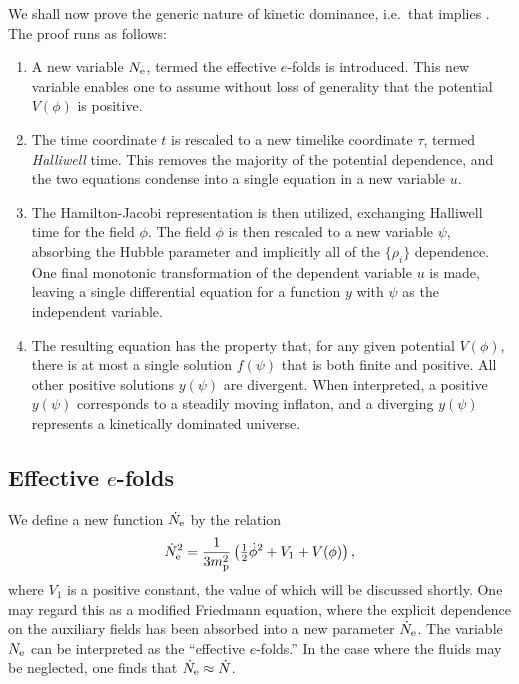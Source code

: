We shall now prove the generic nature of kinetic dominance, i.e.\ that
 implies . The proof runs as
follows:
%
\renewcommand{\theenumi}{\Alph{enumi}}
%
\begin{enumerate}
  \item                                        
    A new variable $N_\mathrm{e}$, termed the effective $e$-folds is
    introduced. This new variable enables one to assume without loss
    of generality that the potential $V(\phi)$ is positive.
  \item
    The time coordinate $t$ is rescaled to a new timelike coordinate
    $\tau$, termed {\em Halliwell}\/ time. This removes the majority of
    the potential dependence, and the two equations condense into a
    single equation in a new variable $u$.
  \item
    The Hamilton-Jacobi representation is then utilized, exchanging
    Halliwell time for the field $\phi$. The field $\phi$ is then
    rescaled to a new variable $\psi$, absorbing the Hubble parameter
    and implicitly all of the $\{\rho_i\}$ dependence. One final
    monotonic transformation of the dependent variable $u$ is made,
    leaving a single differential equation for a function $y$ with
    $\psi$ as the independent variable.
  \item
    The resulting equation has the property that, for any given
    potential $V(\phi)$, there is at most a single solution $f(\psi)$
    that is both finite and positive. All other positive solutions
    $y(\psi)$ are divergent.  When interpreted, a positive $y(\psi)$
    corresponds to a steadily moving inflaton, and a diverging
    $y(\psi)$ represents a kinetically dominated universe.
\end{enumerate}
%


\subsection{Effective $e$-folds}
We define a new function $\dot{N}_\mathrm{e}$ by the relation
%
\begin{equation}
  \dot{N}_\mathrm{e}^2 = 
  \frac{1}{3m_{\mathrm{p}}^2}\left({\textstyle\frac{1}{2}}\dot{\phi}^2 + V_1+V(\phi) \right),
  \label{eqn:Friedmann_c} 
\end{equation}
%
where $V_1$ is a positive constant, the value of which will be
discussed shortly. One may regard this as a modified Friedmann
equation, where the explicit dependence on the auxiliary fields has
been absorbed into a new parameter $\dot{N}_\mathrm{e}$. The variable $N_\mathrm{e}$ can
be interpreted as the ``effective $e$-folds.'' In the case where the
fluids may be neglected, one finds that $\dot{N}_\mathrm{e}\approx\dot{N}$.

